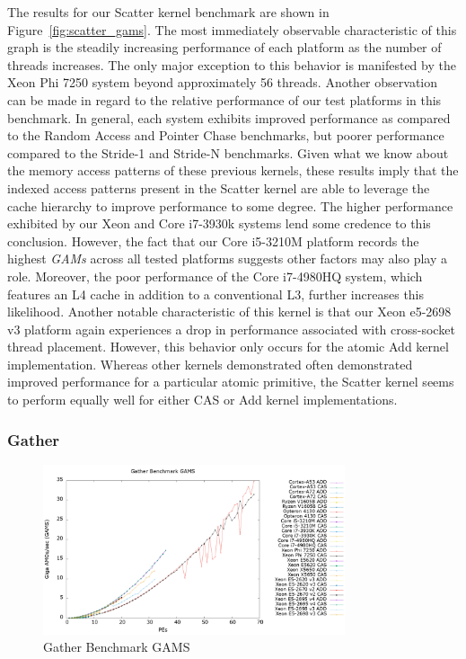 The results for our Scatter kernel benchmark are shown in Figure~\ref{fig:scatter_gams}.
The most immediately observable characteristic of this graph is the steadily increasing performance of each platform as the number of threads increases.
The only major exception to this behavior is manifested by the Xeon Phi 7250 system beyond approximately 56 threads.
Another observation can be made in regard to the relative performance of our test platforms in this benchmark.
In general, each system exhibits improved performance as compared to the Random Access and Pointer Chase benchmarks, but poorer performance compared to the Stride-1 and Stride-N benchmarks.
Given what we know about the memory access patterns of these previous kernels, these results imply that the indexed access patterns present in the Scatter kernel are able to leverage the cache hierarchy to improve performance to some degree.
The higher performance exhibited by our Xeon and Core i7-3930k systems lend some credence to this conclusion.
However, the fact that our Core i5-3210M platform records the highest \textit{GAMs} across all tested platforms suggests other factors may also play a role.
Moreover, the poor performance of the Core i7-4980HQ system, which features an L4 cache in addition to a conventional L3, further increases this likelihood.
Another notable characteristic of this kernel is that our Xeon e5-2698 v3 platform again experiences a drop in performance associated with cross-socket thread placement.
However, this behavior only occurs for the atomic Add kernel implementation.
Whereas other kernels demonstrated often demonstrated improved performance for a particular atomic primitive, the Scatter kernel seems to perform equally well for either CAS or Add kernel implementations.

\subsubsection{Gather}
\label{subsubsec:gather_res}

\begin{figure}[!t]
\centering
\includegraphics[width=3.5in]{figures/GATHER_GAMS.png}
\caption{Gather Benchmark GAMS}
\label{fig:gather_gams}
\end{figure}

